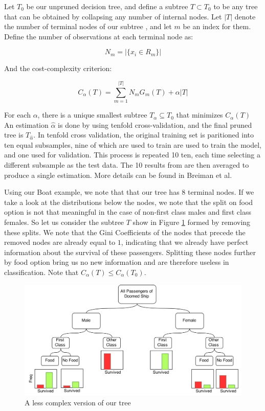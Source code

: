 \documentclass[preprint,12pt]{elsarticle}
\begin{document}
Let $T_{0}$ be our unpruned decision tree, and define a subtree $T \subset T_{0}$ to be any tree that can be obtained by collapsing any number of internal nodes. Let $|T|$ denote the number of terminal nodes of our subtree , and let $m$ be an index for them. Define the number of observations at each terminal node as:

$$N_{m} = |\{x_{i} \in R_{m}\}| $$

\noindent And the cost-complexity criterion:

$$C_{\alpha}(T) = \sum\limits_{m=1}^{|T|} N_{m}G_{m}(T) + \alpha|T|$$

For each $\alpha$, there is a unique smallest subtree $T_{\alpha} \subseteq T_{0}$ that minimizes $C_{\alpha}(T)$ An estimation  $\hat{\alpha}$ is done by using tenfold cross-validation, and the final pruned tree is $T_{\hat{\alpha}}$. In tenfold cross validation, the original training set is paritioned into ten equal subsamples, nine of which are used to train are used to train the model, and one used for validation. This process is repeated 10 ten, each time selecting a different subsample as the test data. The 10 results from are then averaged to produce a single estimation. More details can be found in Breiman et al.\cite{Breiman1984}

Using our Boat example, we note that that our tree has 8 terminal nodes. If we take a look at the distributions below the nodes, we note that the split on food option is not that meaningful in the case of non-first class males and first class females. So let us consider the subtree $T$ show in Figure \ref{fig:Pruned} formed by removing these splits. We note that the Gini Coefficients of the nodes that precede the removed nodes are already equal to $1$, indicating that we already have perfect information about the survival of these passengers. Splitting these nodes further by food option bring us no new information and are therefore useless in classification.
Note that $C_{\alpha}(T) \leq C_{\alpha}(T_{0})$.

\begin{figure}[h]
	\centering
	\includegraphics[width=1\textwidth]{PrunedBoat}
	\caption{A less complex version of our tree}
	\label{fig:Pruned}
\end{figure}
\end{document}
